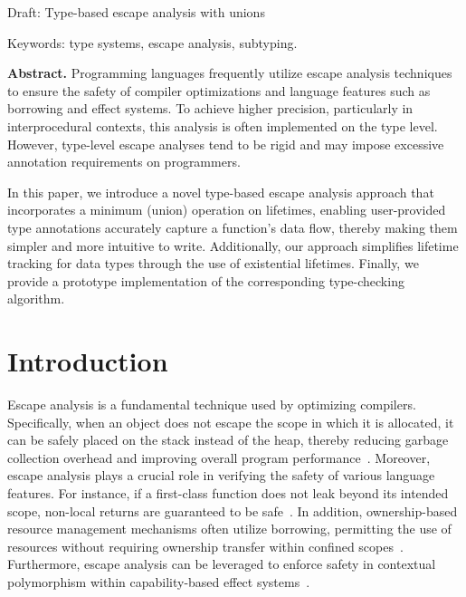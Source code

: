 \documentclass[11pt]{article}
\begin{document}
    \begin{center}
        \LARGE
        Draft: Type-based escape analysis with unions

        \small
%

        Keywords: type systems, escape analysis, subtyping.
    \end{center}

    \textbf{Abstract.}
    Programming languages frequently utilize escape analysis techniques to ensure the safety of compiler optimizations and language features such as borrowing and effect systems.
    To achieve higher precision, particularly in interprocedural contexts, this analysis is often implemented on the type level.
    However, type-level escape analyses tend to be rigid and may impose excessive annotation requirements on programmers.

    In this paper, we introduce a novel type-based escape analysis approach that incorporates a minimum (union) operation on lifetimes, enabling user-provided type annotations accurately capture a function’s data flow, thereby making them simpler and more intuitive to write.
    Additionally, our approach simplifies lifetime tracking for data types through the use of existential lifetimes.
    Finally, we provide a prototype implementation of the corresponding type-checking algorithm.


    \section{Introduction}


    Escape analysis is a fundamental technique used by optimizing compilers.
    Specifically, when an object does not escape the scope in which it is allocated, it can be safely placed on the stack instead of the heap, thereby reducing garbage collection overhead and improving overall program performance~\cite{blanchet1999escape}.
    Moreover, escape analysis plays a crucial role in verifying the safety of various language features.
    For instance, if a first-class function does not leak beyond its intended scope, non-local returns are guaranteed to be safe~\cite{akhin2021kotlin}.
    In addition, ownership-based resource management mechanisms often utilize borrowing, permitting the use of resources without requiring ownership transfer within confined scopes~\cite{matsakis2014rust, lorenzen2024oxidizing}.  %
    Furthermore, escape analysis can be leveraged to enforce safety in contextual polymorphism within capability-based effect systems~\cite{brachthauser2020effects, boruch2023capturing}.
\end{document}

